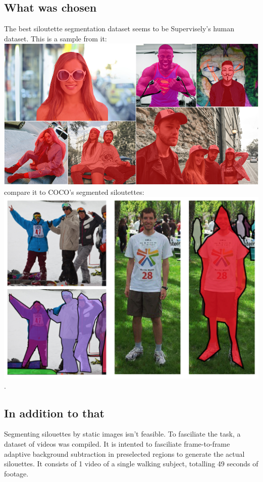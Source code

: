 \documentclass{article}
\begin{document}
\subsection{What was chosen}
The best siloutette segmentation dataset seems to be Supervisely's human dataset\cite{supervisely}. This is a sample from it:
\\
\includegraphics[height=0.5\textwidth]{../img/supervisely}
\\
compare it to COCO's segmented siloutettes:
\\
\includegraphics[height=0.5\textheight]{../img/coco}.

\subsection{In addition to that}
Segmenting silouettes by static images isn't feasible.
To fasciliate the task, a dataset of videos was compiled.
It is intented to fasciliate frame-to-frame adaptive background subtraction in preselected regions to generate the actual silouettes.
It consists of 1 video of a single walking subject, totalling 49 seconds of footage.
\end{document}
